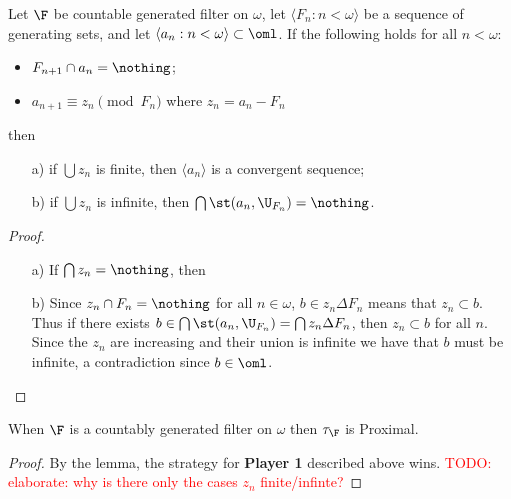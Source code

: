\documentclass{article}
\begin{document}
\begin{lem}
    Let \(\F\) be countable generated filter on \(\omega\), let \(\langle F_n : n < \omega\rangle\) be a sequence of generating sets, and let \(\langle a_n : n < \omega\rangle \subset \oml\). If the following holds for all \(n < \omega\):
    \begin{itemize}
        \item \(F_{n + 1} \cap a_n = \nothing\);
        \item \(a_{n + 1} \equiv z_n \pmod {F_n}\) where \(z_n = a_n - F_n\)
    \end{itemize}
    then 
    \begin{enumerate}
        \item[a)] if \(\bigcup z_n\) is finite, then \(\langle a_n \rangle\) is a convergent sequence;
        \item[b)] if \(\bigcup z_n\) is infinite, then \(\bigcap \st(a_n, \U_{F_n}) = \nothing\).
    \end{enumerate}
\end{lem}
\begin{proof}
    \leavevmode
    \begin{enumerate}
        \item[a)] If \(\bigcap z_n = \nothing\), then
        \item[b)] Since \(z_n\cap F_n = \nothing\) for all \(n \in \omega\), \(b \in z_n \Delta F_n\) means that \(z_n \subset b\). Thus if there exists \(b \in \bigcap \st(a_n, \U_{F_n}) = \bigcap z_n\Delta F_n\), then \(z_n \subset b\) for all \(n\). Since the \(z_n\) are increasing and their union is infinite we have that \(b\) must be infinite, a contradiction since \(b \in \oml\).
    \end{enumerate}
\end{proof}
\begin{prop}
    When \(\F\) is a countably generated filter on \(\omega\) then \(\tau_{\F}\) is Proximal.
\end{prop}
\begin{proof}
    By the lemma, the strategy for \textbf{Player 1} described above wins. \textcolor{red}{TODO: elaborate: why is there only the cases $z_n$ finite/infinte?}
\end{proof}
\end{document}
